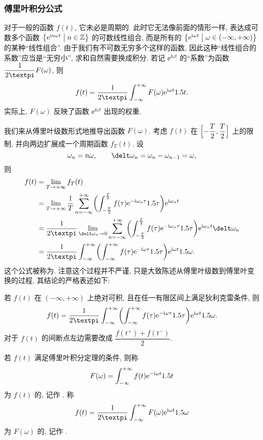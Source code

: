 \subsubsection{傅里叶积分公式}

对于一般的函数 $f(t)$, 它未必是周期的.
此时它无法像前面的情形一样, 表达成可数多个函数 $\bigl\{\mathrm{e}^{\mathrm{i} n\omega t}\bigm\vert n\in{\mathbb{Z}}\bigr\}$ 的可数线性组合, 而是所有的 $\bigl\{\mathrm{e}^{\mathrm{i} \omega t}\bigm\vert \omega\in(-\infty,+\infty)\bigr\}$ 的某种``线性组合''.
由于我们有不可数无穷多个这样的函数, 因此这种``线性组合的系数''应当是``无穷小'', 求和自然需要换成积分.
若记 $\ee^{\ii \omega t}$ 的``系数''为函数 $\dfrac1{2\cpi}F(\omega)$, 则
\[
  f(t)=\frac1{2\cpi}\intff F(\omega) \ee^{\ii \omega t}\d t.
\]
实际上, $F(\omega)$ 反映了函数 $\ee^{\ii\omega t}$ 出现的权重.

我们来从傅里叶级数形式地推导出函数 $F(\omega)$.
考虑 $f(t)$ 在 $\Bigl[-\dfrac T2,\dfrac T2\Bigr]$ 上的限制, 并向两边扩展成一个周期函数 $f_T(t)$.
设
\[
  \omega_n=n\omega,\qquad \delt\omega_n=\omega_n-\omega_{n-1}=\omega,
\]
则
\begin{align*}
  f(t)&=\lim_{T\ra +\infty}f_T(t)\\
  &=\lim_{T\ra+\infty} \frac 1T \sumff 
    \biggl(\intT f(\tau)\ee^{-\ii \omega_n\tau}\d\tau\biggr)
  \ee^{\ii \omega_n t}\\
  &=\frac1{2\cpi}\lim_{\delt\omega_n\ra 0}\sumff 
    \biggl(\intT f(\tau)\ee^{-\ii \omega_n\tau} \d \tau\biggr)\ee^{\ii \omega_n t}
  \delt\omega_n\\
  &=\frac1{2\cpi}\intff 
    \biggl(\intff f(\tau) \ee^{-\ii \omega\tau} \d \tau\biggr)\ee^{\ii \omega t}
  \d\omega.
\end{align*}
这个公式被称为.
注意这个过程并不严谨, 只是大致陈述从傅里叶级数到傅里叶变换的过程, 其结论的严格表述如下:

\begin{theorem}[傅里叶积分定理]
  若 $f(t)$ 在 $(-\infty,+\infty)$ 上绝对可积, 且在任一有限区间上满足狄利克雷条件, 则
  \begin{equation}\label{eq:fourier-integral}
    f(t)=\frac1{2\cpi}\intff 
    \biggl(\intff f(\tau) \ee^{-\ii \omega\tau} \d \tau\biggr)\ee^{\ii \omega t}
    \d\omega.
  \end{equation}
  对于 $f(t)$ 的间断点左边需要改成 $\dfrac{f(t^+)+f(t^-)}2$.
\end{theorem}

\begin{definition}
  若 $f(t)$ 满足傅里叶积分定理的条件, 则称
  \[
    F(\omega)=\displaystyle\int_{-\infty}^{+\infty} f(t) \mathrm{e}^{-\mathrm{i} \omega t} 1.5 t
  \]
  为 $f(t)$ 的, 记作 \nouns{$\msf[f(t)]$}.
  称
  \[
    f(t)=\frac1{2\cpi} \intff F(\omega) \ee^{\ii \omega t} \d\omega
  \]
  为 $F(\omega)$ 的, 记作 .
\end{definition}

